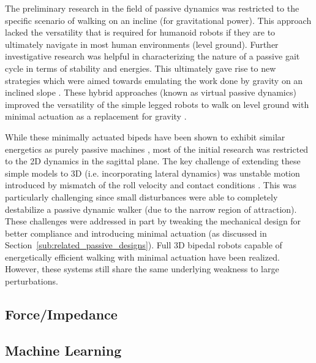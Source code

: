 The preliminary research in the field of passive dynamics was restricted to the specific scenario of walking on an incline (for gravitational power). This approach lacked the versatility that is required for humanoid robots if they are to ultimately navigate in most human environments (level ground). Further investigative research was helpful in characterizing the nature of a passive gait cycle \cite{Goswami:1996gn} in terms of stability and energies. This ultimately gave rise to new strategies which were aimed towards emulating the work done by gravity on an inclined slope \cite{Asano:2000wi}. These hybrid approaches (known as virtual passive dynamics) improved the versatility of the simple legged robots to walk on level ground with minimal actuation as a replacement for gravity \cite{Asano:2004tv}. 

While these minimally actuated bipeds have been shown to exhibit similar energetics as purely passive machines \cite{Asano:2004jp}, most of the initial research was restricted to the 2D dynamics in the sagittal plane. The key challenge of extending these simple models to 3D (i.e. incorporating lateral dynamics) was unstable motion introduced by mismatch of the roll velocity and contact conditions \cite{Kuo:1999tn}. This was particularly challenging since small disturbances were able to completely destabilize a passive dynamic walker (due to the narrow region of attraction). These challenges were addressed in part by tweaking the mechanical design for better compliance and introducing minimal actuation (as discussed in Section~\ref{sub:related_passive_designs}). Full 3D bipedal robots capable of energetically efficient walking with minimal actuation have been realized. However, these systems still share the same underlying weakness to large perturbations. 


\subsection{Force/Impedance} %
\label{sub:related_force_impedance}
\Incomplete


\subsection{Machine Learning} %
\label{sub:related_machine_learning}
\Incomplete


